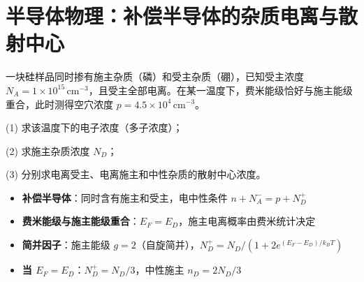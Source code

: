 \section{半导体物理：补偿半导体的杂质电离与散射中心}
\label{sec:compensated-semiconductor}

\begin{modelbox}[题目：补偿半导体中的载流子与散射中心浓度]
一块硅样品同时掺有施主杂质（磷）和受主杂质（硼），已知受主浓度 $N_A=1\times10^{15}\,\text{cm}^{-3}$，且受主全部电离。在某一温度下，费米能级恰好与施主能级重合，此时测得空穴浓度 $p=4.5\times10^4\,\text{cm}^{-3}$。

(1) 求该温度下的电子浓度（多子浓度）；

(2) 求施主杂质浓度 $N_D$；

(3) 分别求电离受主、电离施主和中性杂质的散射中心浓度。
\end{modelbox}

\begin{tipbox}[考点快速分析]
\begin{itemize}
    \item \textbf{补偿半导体}：同时含有施主和受主，电中性条件 $n+N_A^-=p+N_D^+$
    \item \textbf{费米能级与施主能级重合}：$E_F=E_D$，施主电离概率由费米统计决定
    \item \textbf{简并因子}：施主能级 $g=2$（自旋简并），$N_D^+=N_D/(1+2e^{(E_F-E_D)/k_BT})$
    \item \textbf{当 $E_F=E_D$}：$N_D^+=N_D/3$，中性施主 $n_D=2N_D/3$
\end{itemize}
\end{tipbox}

